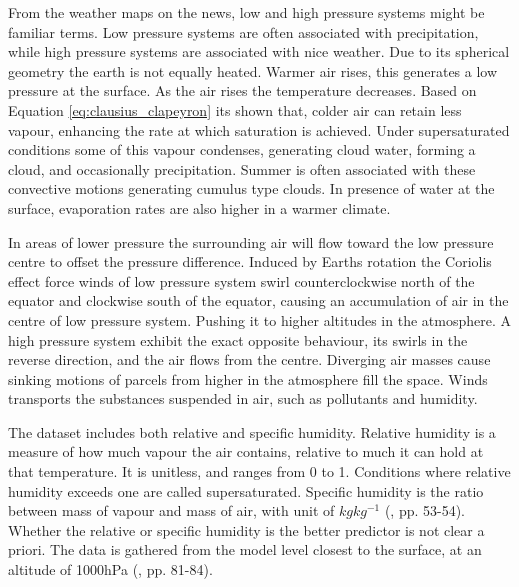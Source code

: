 From the weather maps on the news, low and high pressure systems might be familiar terms. Low pressure systems are often associated with precipitation, while high pressure systems are associated with nice weather. Due to its spherical geometry the earth is not equally heated. Warmer air rises, this generates a low pressure at the surface. As the air rises the temperature decreases. Based on Equation \eqref{eq:clausius_clapeyron} its shown that, colder air can retain less vapour, enhancing the rate at which saturation is achieved. Under supersaturated conditions some of this vapour condenses, generating cloud water, forming a cloud, and occasionally precipitation. Summer is often associated with these convective motions generating cumulus type clouds. In presence of water at the surface, evaporation rates are also higher in a warmer climate. 

In areas of lower pressure the surrounding air will flow toward the low pressure centre to offset the pressure difference. Induced by Earths rotation the Coriolis effect force winds of low pressure system swirl counterclockwise north of the equator and clockwise south of the equator, causing an accumulation of air in the centre of low pressure system. Pushing it to higher altitudes in the atmosphere. A high pressure system exhibit the exact opposite behaviour, its swirls in the reverse direction, and the air flows from the centre. Diverging air masses cause sinking motions of parcels from higher in the atmosphere fill the space.
Winds transports the substances suspended in air, such as pollutants and humidity.

The dataset includes both relative and specific humidity. Relative humidity is a measure of how much vapour the air contains, relative to much it can hold at that temperature. It is unitless, and ranges from 0 to 1. Conditions where relative humidity exceeds one are called supersaturated. Specific humidity is the ratio between mass of vapour and mass of air, with unit of $kg kg^{-1}$ (\cite{lohmann2016}, pp. 53-54). Whether the relative or specific humidity is the better predictor is not clear a priori. The data is gathered from the model level closest to the surface, at an altitude of 1000hPa (\cite{lohmann2016}, pp. 81-84). 

